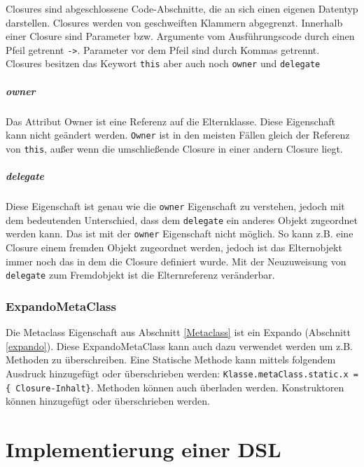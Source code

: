 \documentclass[11pt,english,ngerman, headsepline]{scrreprt}
\begin{document}
Closures sind abgeschlossene Code-Abschnitte, die an sich einen eigenen
Datentyp darstellen. Closures werden von geschweiften Klammern abgegrenzt.
Innerhalb einer Closure sind Parameter bzw. Argumente vom Ausführungscode durch
einen Pfeil getrennt \texttt{->}. Parameter vor dem Pfeil sind durch Kommas
getrennt.
Closures besitzen das Keywort \texttt{this} aber auch noch \texttt{owner} und
\texttt{delegate}

\paragraph{owner}
Das Attribut Owner ist eine Referenz auf die Elternklasse. Diese Eigenschaft
kann nicht geändert werden. \texttt{Owner} ist in den meisten Fällen gleich der
Referenz von  \texttt{this}, außer wenn die umschließende Closure in einer
andern Closure liegt.
\paragraph{delegate}
Diese Eigenschaft ist genau wie die \texttt{owner} Eigenschaft zu verstehen,
jedoch mit dem bedeutenden Unterschied, dass dem \texttt{delegate} ein anderes
Objekt zugeordnet werden kann. Das ist mit der \texttt{owner} Eigenschaft nicht
möglich. So kann z.B. eine Closure einem fremden Objekt zugeordnet werden,
jedoch ist das Elternobjekt immer noch das in dem die Closure definiert wurde.
Mit der Neuzuweisung von \texttt{delegate} zum Fremdobjekt ist die
Elternreferenz veränderbar.

\subsection{ExpandoMetaClass}

Die Metaclass Eigenschaft aus Abschnitt \ref{Metaclass} ist ein Expando
(Abschnitt \ref{expando}).
Diese ExpandoMetaClass kann auch dazu verwendet werden um z.B. Methoden zu
überschreiben. Eine Statische Methode kann mittels folgendem Ausdruck hinzugefügt
oder überschrieben werden: \texttt{Klasse.metaClass.static.x = \{
Closure-Inhalt\}}. 
Methoden können auch überladen werden. Konstruktoren können hinzugefügt oder
überschrieben werden. 
  

 


 
\chapter{Implementierung einer DSL }
\end{document}
